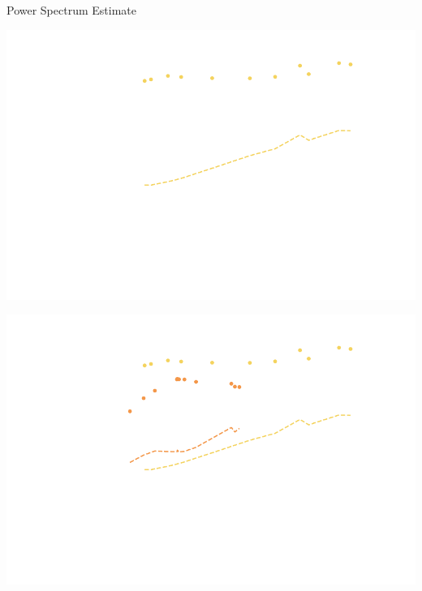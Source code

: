 \documentclass{beamer}
\begin{document}
\begin{frame}{Power Spectrum Estimate}
    \begin{overprint}
        \begin{center}
            \includegraphics[height=0.75\textheight]{figures/spherical-power-spectra/spherical-power-spectrum-filter-strength-1.pdf}
        \end{center}
        \begin{center}
            \includegraphics[height=0.75\textheight]{figures/spherical-power-spectra/spherical-power-spectrum-filter-strength-2.pdf}
        \end{center}
        \begin{center}

\end{center}
\end{overprint}
\end{frame}
\end{document}
